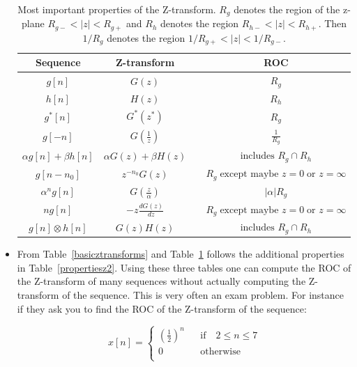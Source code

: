 \documentclass[a4paper,11pt,oneside]{article}
\begin{document}
\begin{itemize}
\begin{table}
\centering
\begin{tabular}{cccc} 
\hline
Sequence & Z-transform && ROC\\
\hline
$g[n]$ & $G(z)$ && $R_g$\vspace{.2cm}\\
$h[n]$ & $H(z)$ && $R_h$\vspace{.2cm}\\
\hline
$g^*[n]$ & $G^*(z^*)$ && $R_g$\vspace{.2cm}\\
$g[-n]$ & $G(\frac{1}{z})$ && $\frac{1}{R_g}$\vspace{.2cm}\\
$\alpha g[n]+\beta h[n]$ & $\alpha G(z) + \beta H(z)$ && $\textrm{includes } R_g\cap R_h$\vspace{.2cm}\\
$g[n-n_0]$ & $z^{-n_0}G(z)$ && $R_g\;\textrm{except maybe } z=0\;\textrm{or } z=\infty$\vspace{.2cm}\\
$\alpha^n g[n]$ & $G(\frac{z}{\alpha})$ && $|\alpha|R_g$\vspace{.2cm}\\
$ng[n]$ & $-z\frac{dG(z)}{dz}$ && $R_g\;\textrm{except maybe } z=0\;\textrm{or } z=\infty$\vspace{.2cm}\\
$g[n]\otimes h[n]$ & $G(z)H(z)$ && $\textrm{includes } R_g\cap R_h$\vspace{.2cm}\\
\hline
\end{tabular}
\caption{Most important properties of the Z-transform. $R_g$ denotes the region of the z-plane $R_{g-}<|z|<R_{g+}$ and $R_h$ denotes the region $R_{h-}<|z|<R_{h+}$. Then $1/R_g$ denotes the region $1/R_{g+}<|z|<1/R_{g-}$.}
\label{propertiesz}
\end{table}

\item From Table~\ref{basicztransforms} and Table~\ref{propertiesz} follows the additional properties in Table~\ref{propertiesz2}. Using these three tables one can compute the ROC of the Z-transform of many sequences without actually computing the Z-transform of the sequence. This is very often an exam problem. For instance if they ask you to find the ROC of the Z-transform of the sequence:

\[
x[n] = \left\{
\begin{array}{lll}
\left(\frac{1}{2}\right)^n &&\textrm{if}\quad 2\leq n \leq 7\\
0&&\textrm{otherwise}\\
\end{array}
\right.
\]


\end{itemize}
\end{document}
